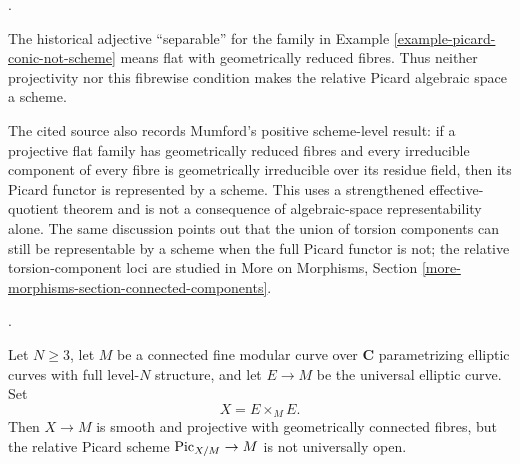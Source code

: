 \begin{remark}
\label{remark-mumford-picard-scheme-boundary}
\begin{reference}
\cite[Expos\'e 236, Section 0(a), pp. 221--222]{FGA}.
\end{reference}
The historical adjective ``separable'' for the family in
Example \ref{example-picard-conic-not-scheme} means flat with geometrically
reduced fibres. Thus neither projectivity nor this fibrewise condition makes
the relative Picard algebraic space a scheme.

The cited source also records Mumford's positive scheme-level result: if a
projective flat family has geometrically reduced fibres and every
irreducible component of every fibre is geometrically irreducible over its
residue field, then its Picard functor is represented by a scheme. This uses
a strengthened effective-quotient theorem and is not a consequence of
algebraic-space representability alone. The same discussion points out that
the union of torsion components can still be representable by a scheme when
the full Picard functor is not; the relative torsion-component loci are
studied in More on Morphisms, Section
\ref{more-morphisms-section-connected-components}.
\end{remark}

\begin{example}
\label{example-picard-neron-severi-jump-not-open}
\begin{reference}
\cite[Expos\'e 236, Remark 1.6, p. 228]{FGA}.
\end{reference}
Let $N \geq 3$, let $M$ be a connected fine modular curve over
$\mathbf{C}$ parametrizing elliptic curves with full level-$N$ structure,
and let $E \to M$ be the universal elliptic curve. Set
$$
X=E\times_M E.
$$
Then $X \to M$ is smooth and projective with geometrically connected fibres,
but the relative Picard scheme $\mathrm{Pic}_{X/M} \to M$ is not
universally open.
\end{example}

